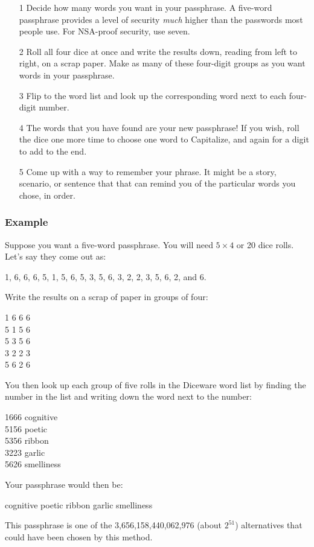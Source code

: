 \begin{itemize}[leftmargin=*]

\item[1] Decide how many words you want in your passphrase. A five-word passphrase provides a level of security \textit{much} higher than the passwords most people use. For NSA-proof security, use seven.

\item[2] Roll all four dice at once and write the results down, reading from left to right, on a scrap paper. Make as many of these four-digit groups as you want words in your passphrase.

\item[3] Flip to the word list and look up the corresponding word next to each four-digit number.

\item[4] The words that you have found are your new passphrase! If you wish, roll the dice one more time to choose one word to Capitalize, and again for a digit to add to the end.

\item[5] Come up with a way to remember your phrase. It might be a story, scenario, or sentence that that can remind you of the particular words you chose, in order.

\end{itemize}

\subsubsection*{Example}

Suppose you want a five-word passphrase. You will need $5 \times 4$ or 20 dice rolls. Let's say they come out as:

1, 6, 6, 6, 5, 1, 5, 6, 5, 3, 5, 6, 3, 2, 2, 3, 5, 6, 2, and 6. 

Write the results on a scrap of paper in groups of four:

1 6 6 6 \\
5 1 5 6 \\
5 3 5 6 \\
3 2 2 3 \\
5 6 2 6

You then look up each group of five rolls in the Diceware word list by finding the number in the list and writing down the word next to the number:

1666 cognitive \\
5156 poetic \\
5356 ribbon \\
3223 garlic \\
5626 smelliness

Your passphrase would then be:

cognitive poetic ribbon garlic smelliness

This passphrase is one of the 3,656,158,440,062,976 (about $2^{51}$) alternatives that could have been chosen by this method. 

\newpage
{}
\fontsize{5}{2mm}\selectfont
\begin{multicols}{5}
\noindent
\end{multicols}
\restoregeometry

